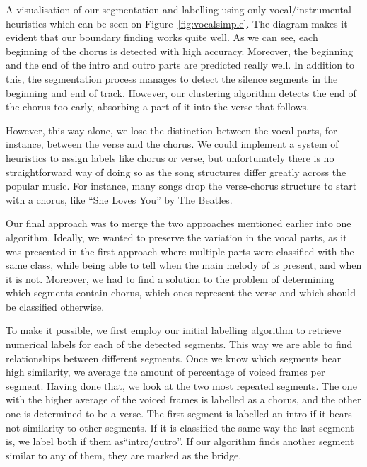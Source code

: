 A visualisation of our segmentation and labelling using only vocal/instrumental heuristics which can be seen on Figure~\ref{fig:vocalsimple}. The diagram makes it evident that our boundary finding works quite well. As we can see, each beginning of the chorus is detected with high accuracy. Moreover, the beginning and the end of the intro and outro parts are predicted really well. In addition to this, the segmentation process manages to detect the silence segments in the beginning and end of track. However, our clustering algorithm detects the end of the chorus too early, absorbing a part of it into the verse that follows.


However, this way alone, we lose the distinction between the vocal parts, for instance, between the verse and the chorus. We could implement a system of heuristics to assign labels like chorus or verse, but unfortunately there is no straightforward way of doing so as the song structures differ greatly across the popular music. For instance, many songs drop the verse-chorus structure to start with a chorus, like ``She Loves You'' by The Beatles.

Our final approach was to merge the two approaches mentioned earlier into one algorithm. Ideally, we wanted to preserve the variation in the vocal parts, as it was presented in the first approach where multiple parts were classified with the same class, while being able to tell when the main melody of is present, and when it is not. Moreover, we had to find a solution to the problem of determining which segments contain chorus, which ones represent the verse and which should be classified otherwise.


To make it possible, we first employ our initial labelling algorithm to retrieve numerical labels for each of the detected segments. This way we are able to find relationships between different segments. Once we know which segments bear high similarity, we average the amount of percentage of voiced frames per segment. Having done that, we look at the two most repeated segments. The one with the higher average of the voiced frames is labelled as a chorus, and the other one is determined to be a verse. The first segment is labelled an intro if it bears not similarity to other segments. If it is classified the same way the last segment is, we label both if them as``intro/outro''. If our algorithm finds another segment similar to any of them, they are marked as the bridge.

\vspace{10pt}



